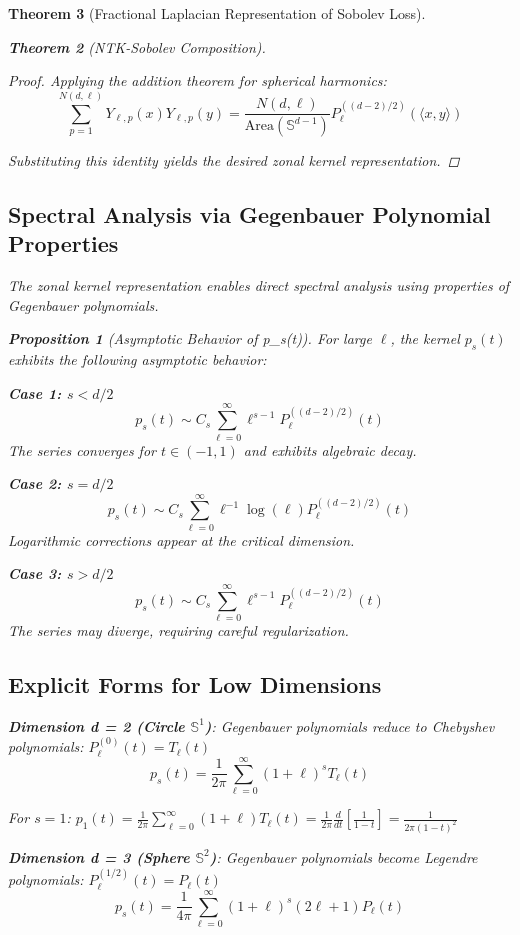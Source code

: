 \documentclass{article}
\newtheorem{theorem}{Theorem}[section]
\newtheorem{proposition}[theorem]{Proposition}
\begin{document}
\begin{theorem}[Fractional Laplacian Representation of Sobolev Loss]
\begin{theorem}[NTK-Sobolev Composition]
\begin{proof}
Applying the addition theorem for spherical harmonics:
\[ \sum_{p=1}^{N(d,\ell)} Y_{\ell,p}(x) Y_{\ell,p}(y) = \frac{N(d,\ell)}{\text{Area}(\mathbb{S}^{d-1})} P_\ell^{((d-2)/2)}(\langle x, y \rangle) \]

Substituting this identity yields the desired zonal kernel representation.
\end{proof}

\subsection{Spectral Analysis via Gegenbauer Polynomial Properties}

The zonal kernel representation enables direct spectral analysis using properties of Gegenbauer polynomials.

\begin{proposition}[Asymptotic Behavior of p_s(t)]
For large $\ell$, the kernel $p_s(t)$ exhibits the following asymptotic behavior:

\textbf{Case 1: $s < d/2$}
\[ p_s(t) \sim C_s \sum_{\ell=0}^{\infty} \ell^{s-1} P_\ell^{((d-2)/2)}(t) \]
The series converges for $t \in (-1, 1)$ and exhibits algebraic decay.

\textbf{Case 2: $s = d/2$} 
\[ p_s(t) \sim C_s \sum_{\ell=0}^{\infty} \ell^{-1} \log(\ell) P_\ell^{((d-2)/2)}(t) \]
Logarithmic corrections appear at the critical dimension.

\textbf{Case 3: $s > d/2$}
\[ p_s(t) \sim C_s \sum_{\ell=0}^{\infty} \ell^{s-1} P_\ell^{((d-2)/2)}(t) \]
The series may diverge, requiring careful regularization.
\end{proposition}

\subsection{Explicit Forms for Low Dimensions}

\textbf{Dimension d = 2 (Circle $\mathbb{S}^1$)}:
Gegenbauer polynomials reduce to Chebyshev polynomials: $P_\ell^{(0)}(t) = T_\ell(t)$
\[ p_s(t) = \frac{1}{2\pi} \sum_{\ell=0}^{\infty} (1 + \ell)^s T_\ell(t) \]

For $s = 1$: $p_1(t) = \frac{1}{2\pi} \sum_{\ell=0}^{\infty} (1 + \ell) T_\ell(t) = \frac{1}{2\pi} \frac{d}{dt}\left[\frac{1}{1-t}\right] = \frac{1}{2\pi(1-t)^2}$

\textbf{Dimension d = 3 (Sphere $\mathbb{S}^2$)}:
Gegenbauer polynomials become Legendre polynomials: $P_\ell^{(1/2)}(t) = P_\ell(t)$
\[ p_s(t) = \frac{1}{4\pi} \sum_{\ell=0}^{\infty} (1 + \ell)^s (2\ell + 1) P_\ell(t) \]


\end{theorem}
\end{theorem}
\end{document}
